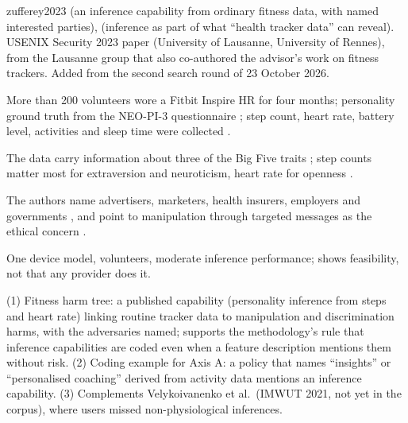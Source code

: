 \begin{papercard}{zufferey2023}
  (an inference capability from ordinary fitness data, with named interested parties),  (inference as part of what ``health tracker data'' can reveal). USENIX Security 2023 paper (University of Lausanne, University of Rennes), from the Lausanne group that also co-authored the advisor's work on fitness trackers. Added from the second search round of 23 October 2026.

 More than 200 volunteers wore a Fitbit Inspire HR for four months; personality ground truth from the NEO-PI-3 questionnaire ; step count, heart rate, battery level, activities and sleep time were collected .

 The data carry information about three of the Big Five traits ; step counts matter most for extraversion and neuroticism, heart rate for openness .

 The authors name advertisers, marketers, health insurers, employers and governments , and point to manipulation through targeted messages as the ethical concern .

 One device model, volunteers, moderate inference performance; shows feasibility, not that any provider does it.

 (1) Fitness harm tree: a published capability (personality inference from steps and heart rate) linking routine tracker data to manipulation and discrimination harms, with the adversaries named; supports the methodology's rule that inference capabilities are coded even when a feature description mentions them without risk. (2) Coding example for Axis A: a policy that names ``insights'' or ``personalised coaching'' derived from activity data mentions an inference capability. (3) Complements Velykoivanenko et al.\ (IMWUT 2021, not yet in the corpus), where users missed non-physiological inferences.
\end{papercard}
